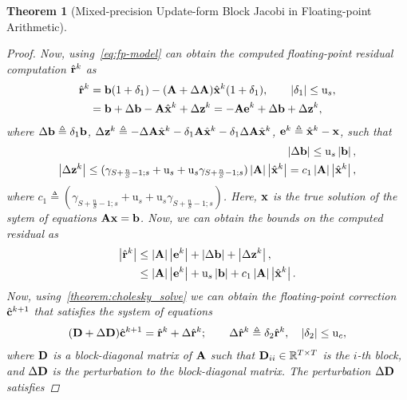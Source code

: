 \documentclass[11pt,draft]{article}
\newcommand{\urd}{\ensuremath{\mathrm{u}}}
\newcommand{\define}{\ensuremath{\triangleq}}
\newcommand{\vect}[1]{\mathbf{\MakeLowercase{#1}}}
\newcommand{\mat}[1]{\mathbf{\MakeUppercase{#1}}}
\newcommand{\ireal}[1]{\in\mathbb{R}^{#1}}
\newtheorem{theorem}{Theorem}[section]
\theoremstyle{definition}
\theoremstyle{remark}
\newcommand{\abs}[1]{\left|#1\right|}
\begin{document}
\begin{theorem}[Mixed-precision Update-form Block Jacobi in Floating-point Arithmetic]
\begin{proof}
       Now, using~\cref{eq:fp-model} can obtain the computed floating-point residual computation $\hat{\vect{r}}^k$ as
       \begin{align}
        \hat{\vect{r}}^k &= \vect{b} (1 + \delta_1) - (\mat{a} + \Delta \mat{a})\hat{\vect{x}}^k ( 1 + \delta_1), \qquad \abs{\delta_1} \leq \urd_s,\\
                         &= \vect{b} + \Delta \vect{b} - \mat{a}\hat{\vect{x}}^k + \Delta \vect{z}^k = - \mat{a}\vect{e}^k + \Delta \vect{b} + \Delta \vect{z}^k,
       \end{align}
       where $\Delta \vect{b} \define \delta_1 \vect{b}$, $\Delta \vect{z}^k\define -\Delta \mat{a}\hat{\vect{x}}^k - \delta_1 \mat{a}\hat{\vect{x}}^k - \delta_1 \Delta \mat{a}\hat{\vect{x}}^k$, $\vect{e}^k\define \hat{\vect{x}}^k - \vect{x}$, such that 
       \begin{align}
        \abs{\Delta \vect{b}} \leq \urd_s \abs{\vect{b}},\\
        \abs{\Delta \vect{z}^k} \leq (\gamma_{S + \frac{n}{S}-1;s} + \urd_s + \urd_s\gamma_{S + \frac{n}{S} - 1;s})\abs{\mat{a}}\abs{\hat{\vect{x}}^k} = c_1 \abs{\mat{a}}\abs{\hat{\vect{x}}^k},
       \end{align}
       where $c_1\define (\gamma_{S + \frac{n}{S} - 1;s} + \urd_s + \urd_s\gamma_{S + \frac{n}{S}-1;s})$.
       Here, $\vect{x}$ is the true solution of the sytem of equations $\mat{a}\vect{x} = \vect{b}$.
    Now, we can obtain the bounds on the computed residual as
    \begin{align}
        \abs{\hat{\vect{r}}^k} &\leq \abs{\mat{a}}\abs{\vect{e}^k} + \abs{\Delta \vect{b}} +  \abs{\Delta \vect{z}^k},\\
        &\leq \abs{\mat{a}}\abs{\vect{e}^k} + \urd_s \abs{\vect{b}} + c_1 \abs{\mat{a}}\abs{\hat{\vect{x}}^k}.
    \end{align}
    Now, using~\cref{theorem:cholesky_solve} we can obtain the floating-point correction $\hat{\vect{c}}^{k+1}$ that satisfies the system of equations
    \begin{align}
    (\mat{d} + \Delta \mat{d}) \hat{\vect{c}}^{k+1} = \hat{\vect{r}}^k + \Delta \hat{\vect{r}}^k; \qquad  \Delta \hat{\vect{r}}^k \define \delta_2 \hat{\vect{r}}^k,\quad \abs{\delta_2} \leq \urd_c,
    \end{align}
    where $\mat{d}$ is a block-diagonal matrix of $\mat{a}$ such that $\mat{d}_{ii}\ireal{T\times T}$ is the $i$-th block, and $\Delta \mat{d}$ is the perturbation to the block-diagonal matrix.
    The perturbation $\Delta \mat{d}$ satisfies

\end{proof}
\end{theorem}
\end{document}
